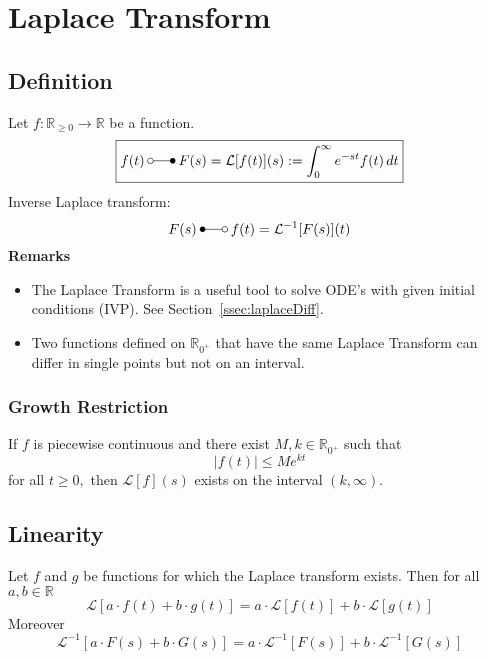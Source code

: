 \section{Laplace Transform}
\subsection{Definition}
Let $f:\mathbb{R}_{\geq 0} \rightarrow \mathbb{R}$ be a function.
\begin{equation*}
    \boxed{
    f(t)\:\laplace\:F(s)=\mathcal{L}[f(t)](s):=\int_{0}^{\infty}e^{-st}f(t)\,dt
    }
\end{equation*}
Inverse Laplace transform:
\begin{equation*}
    F(s)\:\Laplace\:f(t)=\mathcal{L}^{-1}[F(s)](t)
\end{equation*}
\textbf{Remarks}
\begin{itemize}
    \item The Laplace Transform is a useful tool to solve ODE's with given initial conditions (IVP). See Section~\ref{ssec:laplaceDiff}.
    \item Two functions defined on $\mathbb{R}_{0^+}$ that have the same Laplace Transform can differ in single points but not on an interval.
\end{itemize}

\subsubsection{Growth Restriction}
If $f$ is piecewise continuous and there exist $M, k\in \mathbb{R}_{0^+}$ such that
\begin{equation*}
    \left|f(t)\right|\leq Me^{kt}
\end{equation*}
for all $t\geq 0, $ then $\mathcal{L}[f](s) $ exists on the interval $(k,\infty).$


\subsection{Linearity}
Let $f$ and $g$ be functions for which the Laplace transform exists. Then for all $a,b \in \mathbb{R}$
\begin{equation*}
    \mathcal{L}[a\cdot f(t)+b\cdot g(t)] = a\cdot\mathcal{L}[f(t)]+b\cdot\mathcal{L}[g(t)]
\end{equation*}
Moreover
\begin{equation*}
    \mathcal{L}^{-1}[a\cdot F(s)+b\cdot G(s)] = a\cdot\mathcal{L}^{-1}[F(s)]+b\cdot\mathcal{L}^{-1}[G(s)]
\end{equation*}

